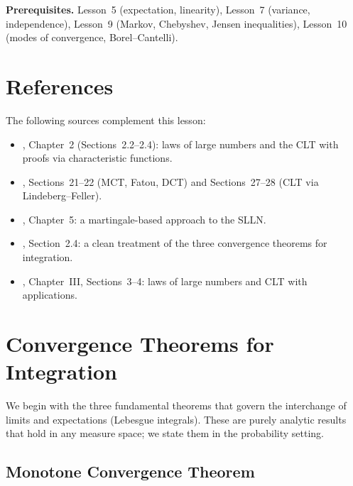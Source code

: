 \documentclass[11pt,a4paper]{article}
\begin{document}
\medskip
\noindent\textbf{Prerequisites.}
Lesson~5 (expectation, linearity), Lesson~7 (variance,
independence), Lesson~9 (Markov, Chebyshev, Jensen inequalities),
Lesson~10 (modes of convergence, Borel--Cantelli).


\section{References}
\label{sec:references}

The following sources complement this lesson:
\begin{itemize}[nosep]
  \item \citet{durrett2019}, Chapter~2 (Sections~2.2--2.4):
    laws of large numbers and the CLT with proofs via
    characteristic functions.
  \item \citet{billingsley1995}, Sections~21--22 (MCT, Fatou, DCT)
    and Sections~27--28 (CLT via Lindeberg--Feller).
  \item \citet{williams1991}, Chapter~5: a martingale-based
    approach to the SLLN.
  \item \citet{folland1999}, Section~2.4: a clean treatment of the
    three convergence theorems for integration.
  \item \citet{shiryaev2016}, Chapter~III, Sections~3--4:
    laws of large numbers and CLT with applications.
\end{itemize}


\section{Convergence Theorems for Integration}
\label{sec:integration_convergence}

We begin with the three fundamental theorems that govern
the interchange of limits and expectations (Lebesgue integrals).
These are purely analytic results that hold in any measure space;
we state them in the probability setting.

\subsection{Monotone Convergence Theorem}
\label{subsec:mct}
\end{document}
